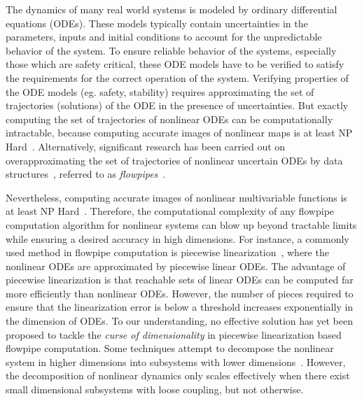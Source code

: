 The dynamics of many real world systems is modeled by ordinary
differential equations (ODEs).  These models typically contain
uncertainties in the parameters, inputs and initial conditions to
account for the unpredictable behavior of the system.  To ensure
reliable behavior of the systems, especially those which are safety
critical, these ODE models have to be verified to satisfy the
requirements for the correct operation of the system.  Verifying
properties of the ODE models (eg. safety, stability) requires
approximating the set of trajectories (solutions) of the ODE in the
presence of uncertainties.  But exactly computing the set of
trajectories of nonlinear ODEs can be computationally intractable,
because computing accurate images of nonlinear maps is at least NP
Hard~\cite{murty1985some}.  Alternatively, significant research has
been carried out on overapproximating the set of trajectories of
nonlinear uncertain ODEs by data
structures~\cite{chen2012taylor,testylier2013nltoolbox,althoff2013reachability,kochdumper2020sparse,ramdani2009hybrid,han2006reachability,maidens2014reachability},
referred to as \emph{flowpipes}~\cite{chen2012taylor}.

Nevertheless, computing accurate images of nonlinear multivariable
functions is at least NP Hard~\cite{murty1985some}.  Therefore, the
computational complexity of any flowpipe computation algorithm for
nonlinear systems can blow up beyond tractable limits while ensuring a
desired accuracy in high dimensions.  For instance, a commonly used
method in flowpipe computation is piecewise
linearization~\cite{ramdani2009hybrid,han2006reachability,althoff2008reachability,li2020reachability,dang2010accurate,bak2016scalable},
where the nonlinear ODEs are approximated by piecewise linear ODEs.
The advantage of piecewise linearization is that reachable sets of
linear ODEs can be computed far more efficiently than nonlinear ODEs.
However, the number of pieces required to ensure that the
linearization error is below a threshold increases exponentially in
the dimension of ODEs.  To our understanding, no effective solution
has yet been proposed to tackle the \emph{curse of dimensionality} in
piecewise linearization based flowpipe computation.  Some techniques
attempt to decompose the nonlinear system in higher dimensions into
subsystems with lower
dimensions~\cite{chen2018decomposition,chen2016decomposed}.  However,
the decomposition of nonlinear dynamics only scales effectively when
there exist small dimensional subsystems with loose coupling, but not
otherwise.


